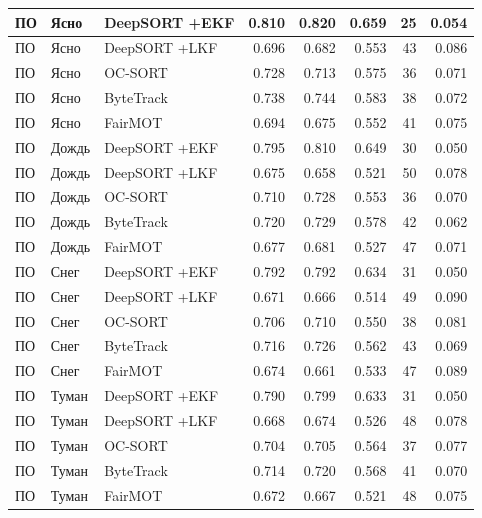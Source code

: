 \begin{longtable}{|p{2.42cm}|p{1.8cm}|p{2.4cm}|r|r|r|r|r|}
       ПО     &      Ясно & DeepSORT +EKF & 0.810 & 0.820 & 0.659 &   25 & 0.054  \\ \hline
       ПО     &      Ясно & DeepSORT +LKF & 0.696 & 0.682 & 0.553 &   43 & 0.086  \\ \hline
       ПО     &      Ясно &      OC-SORT & 0.728 & 0.713 & 0.575 &   36 & 0.071  \\ \hline
       ПО     &      Ясно &    ByteTrack & 0.738 & 0.744 & 0.583 &   38 & 0.072  \\ \hline
       ПО     &      Ясно &      FairMOT & 0.694 & 0.675 & 0.552 &   41 & 0.075  \\ \hline
       ПО     &      Дождь & DeepSORT +EKF & 0.795 & 0.810 & 0.649 &   30 & 0.050 \\ \hline
       ПО     &      Дождь & DeepSORT +LKF & 0.675 & 0.658 & 0.521 &   50 & 0.078 \\ \hline
       ПО     &      Дождь &      OC-SORT & 0.710 & 0.728 & 0.553 &   36 & 0.070  \\ \hline
       ПО     &      Дождь &    ByteTrack & 0.720 & 0.729 & 0.578 &   42 & 0.062  \\ \hline
       ПО     &      Дождь &      FairMOT & 0.677 & 0.681 & 0.527 &   47 & 0.071  \\ \hline
       ПО     &      Снег & DeepSORT +EKF & 0.792 & 0.792 & 0.634 &   31 & 0.050  \\ \hline
       ПО     &      Снег & DeepSORT +LKF & 0.671 & 0.666 & 0.514 &   49 & 0.090  \\ \hline
       ПО     &      Снег &      OC-SORT & 0.706 & 0.710 & 0.550 &   38 & 0.081  \\ \hline
       ПО     &      Снег &    ByteTrack & 0.716 & 0.726 & 0.562 &   43 & 0.069  \\ \hline
       ПО     &      Снег &      FairMOT & 0.674 & 0.661 & 0.533 &   47 & 0.089  \\ \hline
       ПО     &      Туман & DeepSORT +EKF & 0.790 & 0.799 & 0.633 &   31 & 0.050  \\ \hline
       ПО     &      Туман & DeepSORT +LKF & 0.668 & 0.674 & 0.526 &   48 & 0.078  \\ \hline
       ПО     &      Туман &      OC-SORT & 0.704 & 0.705 & 0.564 &   37 & 0.077  \\ \hline
       ПО     &      Туман &    ByteTrack & 0.714 & 0.720 & 0.568 &   41 & 0.070  \\ \hline
       ПО     &      Туман &      FairMOT & 0.672 & 0.667 & 0.521 &   48 & 0.075  \\ \hline

\end{longtable}
